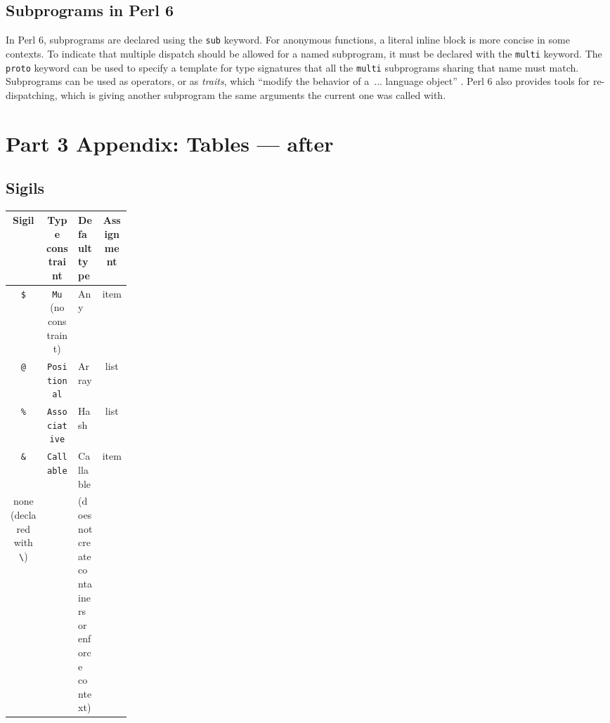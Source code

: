 \documentclass[14pt,english]{extarticle}
\providecommand{\tabularnewline}{\\}
\begin{document}
\subsection*{Subprograms in Perl 6}

In Perl 6, subprograms are declared using the \texttt{sub} keyword.
For anonymous functions, a literal inline block is more concise in
some contexts. To indicate that multiple dispatch should be allowed
for a named subprogram, it must be declared with the \texttt{multi}
keyword. The \texttt{proto} keyword can be used to specify a template
for type signatures that all the \texttt{multi} subprograms sharing
that name must match. Subprograms can be used as operators, or as
\emph{traits}, which ``modify the behavior of a ... language object''
\cite{Documentation}. Perl 6 also provides tools for re-dispatching,
which is giving another subprogram the same arguments the current
one was called with.

\newpage{}
\nocite{*}




\section*{Part 3 Appendix: Tables — after \cite{Documentation} }


\subsection*{Sigils}

{\scriptsize{}}%
\begin{tabular}{|c|c|>{\centering}p{0.2\linewidth}|c|}
\hline 
\textbf{\small{}Sigil} &
\textbf{\small{}Type constraint} &
\textbf{\small{}Default type} &
\textbf{\small{}Assignment}\tabularnewline
\hline 
\hline 
\texttt{\small{}\$} &
\texttt{\small{}Mu}{\small{} (no constraint)} &
{\small{}Any} &
{\small{}item}\tabularnewline
\hline 
\texttt{\small{}@} &
\texttt{\small{}Positional} &
{\small{}Array} &
{\small{}list}\tabularnewline
\hline 
\texttt{\small{}\%} &
\texttt{\small{}Associative} &
{\small{}Hash} &
{\small{}list}\tabularnewline
\hline 
\texttt{\small{}\&} &
\texttt{\small{}Callable} &
{\small{}Callable} &
{\small{}item}\tabularnewline
\hline 
{\small{}none (declared with }\texttt{\small{}\textbackslash{}}{\small{})} &
 &
{\small{}(does not create containers or enforce context)} &
\tabularnewline
\hline 
\end{tabular}{\scriptsize \par}
\end{document}
